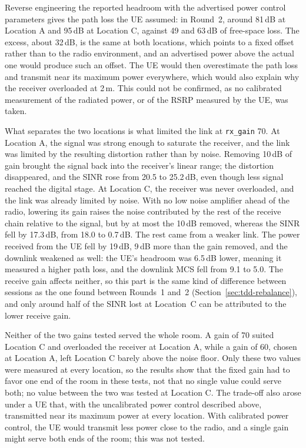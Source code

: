 Reverse engineering the reported headroom with the advertised power control parameters gives the path loss the \gls{UE} assumed: in Round~2, around 81\,dB at Location A and 95\,dB at Location C, against 49 and 63\,dB of free-space loss. The excess, about 32\,dB, is the same at both locations, which points to a fixed offset rather than to the radio environment, and an advertised power above the actual one would produce such an offset. The \gls{UE} would then overestimate the path loss and transmit near its maximum power everywhere, which would also explain why the receiver overloaded at 2\,m. This could not be confirmed, as no calibrated measurement of the radiated power, or of the \gls{RSRP} measured by the \gls{UE}, was taken.

What separates the two locations is what limited the link at \texttt{rx\_gain} 70. At Location A, the signal was strong enough to saturate the receiver, and the link was limited by the resulting distortion rather than by noise. Removing 10\,dB of gain brought the signal back into the receiver's linear range; the distortion disappeared, and the \gls{SINR} rose from 20.5 to 25.2\,dB, even though less signal reached the digital stage. At Location C, the receiver was never overloaded, and the link was already limited by noise. With no low noise amplifier ahead of the radio, lowering its gain raises the noise contributed by the rest of the receive chain relative to the signal, but by at most the 10\,dB removed, whereas the \gls{SINR} fell by 17.3\,dB, from 18.0 to 0.7\,dB. The rest came from a weaker link. The power received from the \gls{UE} fell by 19\,dB, 9\,dB more than the gain removed, and the downlink weakened as well: the \gls{UE}'s headroom was 6.5\,dB lower, meaning it measured a higher path loss, and the downlink \gls{MCS} fell from 9.1 to 5.0. The receive gain affects neither, so this part is the same kind of difference between sessions as the one found between Rounds~1 and~2 (Section~\ref{sec:tdd-rebalance}), and only around half of the \gls{SINR} lost at Location~C can be attributed to the lower receive gain.

Neither of the two gains tested served the whole room. A gain of 70 suited Location C and overloaded the receiver at Location A, while a gain of 60, chosen at Location A, left Location C barely above the noise floor. Only these two values were measured at every location, so the results show that the fixed gain had to favor one end of the room in these tests, not that no single value could serve both; no value between the two was tested at Location C. The trade-off also arose under a \gls{UE} that, with the uncalibrated power control described above, transmitted near its maximum power at every location. With calibrated power control, the \gls{UE} would transmit less power close to the radio, and a single gain might serve both ends of the room; this was not tested. 

